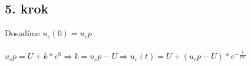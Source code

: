 \subsection*{5. krok}
Dosadíme $u_c(0) = u_cp$\\\\
$u_cp = U + k* e^0 \Rightarrow k = u_cp-U \Rightarrow u_c(t)=U+(u_cp-U)*e^{-\frac{t}{RC}}$

















